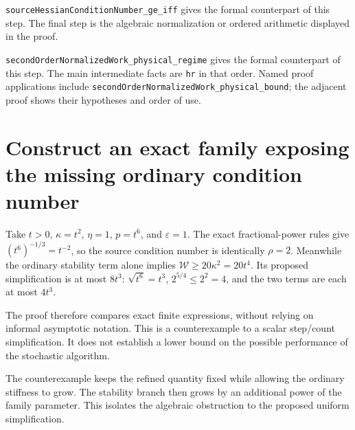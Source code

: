 \documentclass[11pt,a4paper]{article}
\begin{document}
\begin{leanbox}
\texttt{source\allowbreak{}Hessian\allowbreak{}Condition\allowbreak{}Number\_\allowbreak{}ge\_\allowbreak{}iff} gives the formal counterpart of this step. The final step is the algebraic normalization or ordered arithmetic displayed in the proof.




\texttt{second\allowbreak{}Order\allowbreak{}Normalized\allowbreak{}Work\_\allowbreak{}physical\_\allowbreak{}regime} gives the formal counterpart of this step. The main intermediate facts are \texttt{hr} in that order. Named proof applications include \texttt{second\allowbreak{}Order\allowbreak{}Normalized\allowbreak{}Work\_\allowbreak{}physical\_\allowbreak{}bound}; the adjacent proof shows their hypotheses and order of use.
\end{leanbox}

\section{\texorpdfstring{Construct an exact family exposing the missing ordinary condition number}{Construct an exact family exposing the missing ordinary condition number}}


Take \(t>0\), \(\kappa=t^2\), \(\eta=1\), \(p=t^6\), and \(\varepsilon=1\). The exact fractional-power rules give \((t^6)^{-1/3}=t^{-2}\), so the source condition number is identically \(\rho=2\). Meanwhile the ordinary stability term alone implies \(\mathcal W\ge20\kappa^2=20t^4\). Its proposed simplification is at most \(8t^3\): \(\sqrt{t^6}=t^3\), \(2^{5/4}\le2^2=4\), and the two terms are each at most \(4t^3\).



The proof therefore compares exact finite expressions, without relying on informal asymptotic notation. This is a counterexample to a scalar step/\allowbreak{}count simplification. It does not establish a lower bound on the possible performance of the stochastic algorithm.



The counterexample keeps the refined quantity fixed while allowing the ordinary stiffness to grow. The stability branch then grows by an additional power of the family parameter. This isolates the algebraic obstruction to the proposed uniform simplification.
\end{document}
